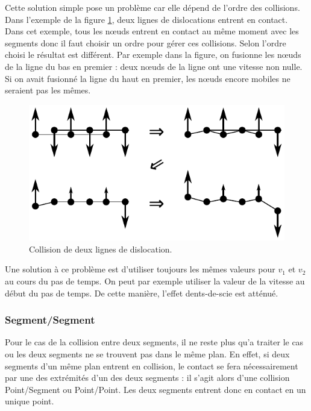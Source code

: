 \documentclass[11pt,class=article,float=false,crop=false]{standalone}
\begin{document}
Cette solution simple pose un problème car elle dépend de l'ordre des collisions. Dans l'exemple de la figure \ref{fig:vitesse_pointseg_probleme}, deux lignes de dislocations entrent en contact. Dans cet exemple, tous les nœuds entrent en contact au même moment avec les segments donc il faut choisir un ordre pour gérer ces collisions. Selon l'ordre choisi le résultat est différent. Par exemple dans la figure, on fusionne les nœuds de la ligne du bas en premier : deux nœuds de la ligne ont une vitesse non nulle. Si on avait fusionné la ligne du haut en premier, les nœuds encore mobiles ne seraient pas les mêmes.

\begin{figure}[H]
	\centering
	\includegraphics[height=0.3\textheight]{img/vitesse_pointseg_probleme}
	\caption{Collision de deux lignes de dislocation.}
	\label{fig:vitesse_pointseg_probleme}
\end{figure}

Une solution à ce problème est d'utiliser toujours les mêmes valeurs pour $v_1$ et $v_2$ au cours du pas de temps. On peut par exemple utiliser la valeur de la vitesse au début du pas de temps. De cette manière, l'effet dents-de-scie est atténué. 


\subsubsection{Segment/Segment}

Pour le cas de la collision entre deux segments, il ne reste plus qu'a traiter le cas ou les deux segments ne se trouvent pas dans le même plan. En effet, si deux segments d'un même plan entrent en collision, le contact se fera nécessairement par une des extrémités d'un des deux segments : il s'agit alors d'une collision Point/Segment ou Point/Point. Les deux segments entrent donc en contact en un unique point. 
\end{document}
